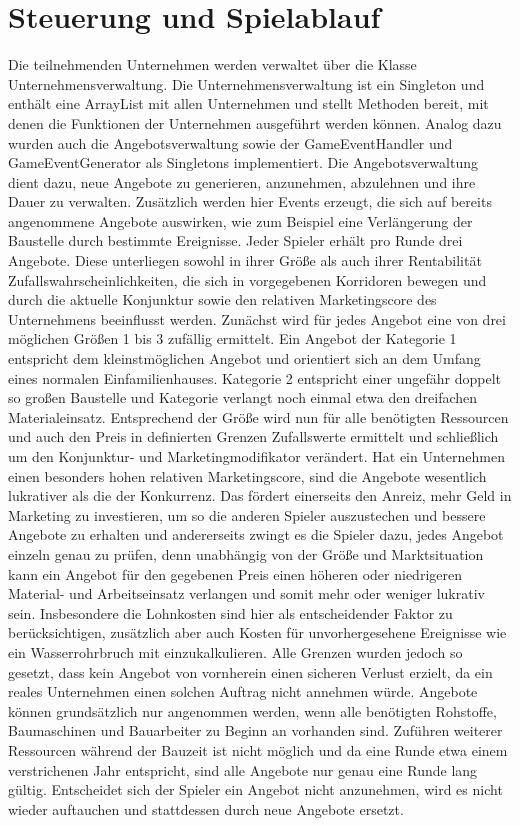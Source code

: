 \section{Steuerung und Spielablauf}
Die teilnehmenden Unternehmen werden verwaltet über die Klasse Unternehmensverwaltung. Die Unternehmensverwaltung ist ein Singleton und enthält eine ArrayList mit allen Unternehmen und stellt Methoden bereit, mit denen die Funktionen der Unternehmen ausgeführt werden können. Analog dazu wurden auch die Angebotsverwaltung sowie der GameEventHandler und GameEventGenerator als Singletons implementiert.
Die Angebotsverwaltung dient dazu, neue Angebote zu generieren, anzunehmen, abzulehnen und ihre Dauer zu verwalten. Zusätzlich werden hier Events erzeugt, die sich auf bereits angenommene Angebote auswirken, wie zum Beispiel eine Verlängerung der Baustelle durch bestimmte Ereignisse.
Jeder Spieler erhält pro Runde drei Angebote. Diese unterliegen sowohl in ihrer Größe als auch ihrer Rentabilität Zufallswahrscheinlichkeiten, die sich in vorgegebenen Korridoren bewegen und durch die aktuelle Konjunktur sowie den relativen Marketingscore des Unternehmens beeinflusst werden. Zunächst wird für jedes Angebot eine von drei möglichen Größen 1 bis 3 zufällig ermittelt. Ein Angebot der Kategorie 1 entspricht dem kleinstmöglichen Angebot und orientiert sich an  dem Umfang eines normalen Einfamilienhauses. Kategorie 2 entspricht einer ungefähr doppelt so großen Baustelle und Kategorie verlangt noch einmal etwa den dreifachen Materialeinsatz.
Entsprechend der Größe wird nun für alle benötigten Ressourcen und auch den Preis in definierten Grenzen Zufallswerte ermittelt und schließlich um den Konjunktur- und Marketingmodifikator verändert. Hat ein Unternehmen einen besonders hohen relativen Marketingscore, sind die Angebote wesentlich lukrativer als die der Konkurrenz. Das fördert einerseits den Anreiz, mehr Geld in Marketing zu investieren, um so die anderen Spieler auszustechen und bessere Angebote zu erhalten und andererseits zwingt es die Spieler dazu, jedes Angebot einzeln genau zu prüfen, denn unabhängig von der Größe und Marktsituation kann ein Angebot für den gegebenen Preis einen höheren oder niedrigeren Material- und Arbeitseinsatz verlangen und somit mehr oder weniger lukrativ sein. Insbesondere die Lohnkosten sind hier als entscheidender Faktor zu berücksichtigen, zusätzlich aber auch Kosten für unvorhergesehene Ereignisse wie ein Wasserrohrbruch mit einzukalkulieren. Alle Grenzen wurden jedoch so gesetzt, dass kein Angebot von vornherein einen sicheren Verlust erzielt, da ein reales Unternehmen einen solchen Auftrag nicht annehmen würde. Angebote können grundsätzlich nur angenommen werden, wenn alle benötigten Rohstoffe, Baumaschinen und Bauarbeiter zu Beginn an vorhanden sind. Zuführen weiterer Ressourcen während der Bauzeit ist nicht möglich und da eine Runde etwa einem verstrichenen Jahr entspricht, sind alle Angebote nur genau eine Runde lang gültig. Entscheidet sich der Spieler ein Angebot nicht anzunehmen, wird es nicht wieder auftauchen und stattdessen durch neue Angebote ersetzt.

